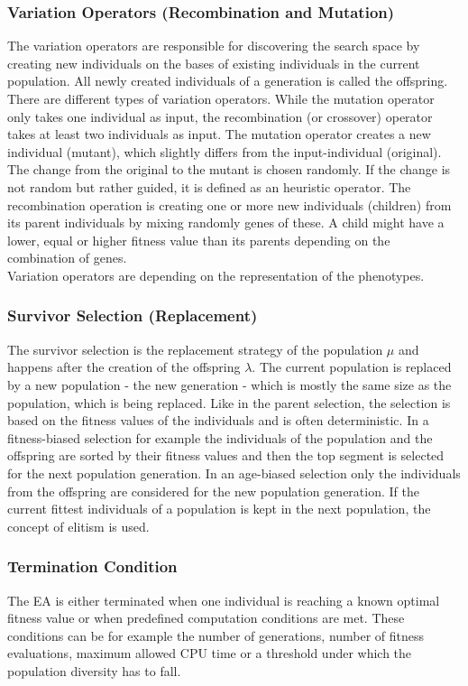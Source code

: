         \subsubsection{Variation Operators (Recombination and Mutation)}
        The variation operators are responsible for discovering the search space by creating new individuals on the bases of existing individuals in the current population. All newly created individuals of a generation is called the offspring.\\
        There are different types of variation operators. While the mutation operator only takes one individual as input, the recombination (or crossover) operator takes at least two individuals as input. The mutation operator creates a new individual (mutant), which slightly differs from the input-individual (original). The change from the original to the mutant is chosen randomly. If the change is not random but rather guided, it is defined as an heuristic operator. The recombination operation is creating one or more new individuals (children) from its parent individuals by mixing randomly genes of these. A child might have a lower, equal or higher fitness value than its parents depending on the combination of genes.\\
        Variation operators are depending on the representation of the phenotypes.
        
        \subsubsection{Survivor Selection (Replacement)}
        The survivor selection is the replacement strategy of the population $\mu$ and happens after the creation of the offspring $\lambda$. The current population is replaced by a new population - the new generation - which is mostly the same size as the population, which is being replaced. Like in the parent selection, the selection is based on the fitness values of the individuals and is often deterministic. In a fitness-biased selection for example the individuals of the population and the offspring are sorted by their fitness values and then the top segment is selected for the next population generation. In an age-biased selection only the individuals from the offspring are considered for the new population generation. If the current fittest individuals of a population is kept in the next population, the concept of elitism is used.
        
        \subsubsection{Termination Condition}
        The EA is either terminated when one individual is reaching a known optimal fitness value or when predefined computation conditions are met. These conditions can be for example the number of generations, number of fitness evaluations, maximum allowed CPU time or a threshold under which the population diversity has to fall.
        
